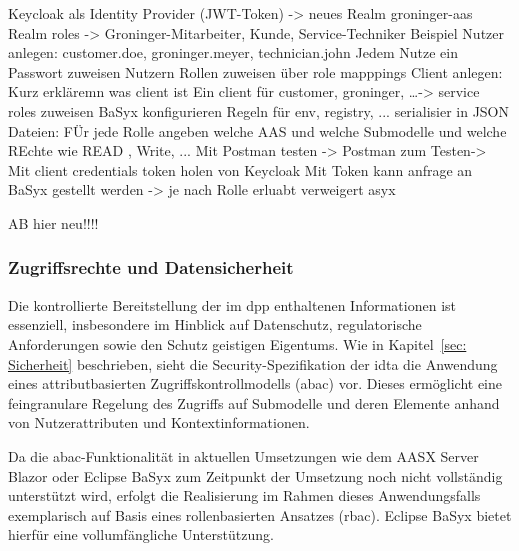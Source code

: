 Keycloak als Identity Provider (JWT-Token) -> neues Realm groninger-aas
Realm roles -> Groninger-Mitarbeiter, Kunde, Service-Techniker
Beispiel Nutzer anlegen: customer.doe, groninger.meyer, technician.john
Jedem Nutze ein Passwort zuweisen
Nutzern Rollen zuweisen über role mapppings
Client anlegen: Kurz erkläremn was client ist
Ein client für customer, groninger, \dots -> service roles zuweisen
BaSyx konfigurieren Regeln für env, registry, ... serialisier in JSON Dateien: 
FÜr jede Rolle angeben welche AAS und welche Submodelle und welche REchte wie READ , Write, ...
Mit Postman testen -> 
Postman zum Testen-> Mit client credentials token holen von Keycloak
Mit Token kann anfrage an BaSyx gestellt werden
 -> je nach Rolle erluabt verweigert asyx 



AB hier neu!!!!

\subsubsection{Zugriffsrechte und Datensicherheit}

Die kontrollierte Bereitstellung der im \acs{dpp} enthaltenen Informationen ist essenziell, insbesondere im Hinblick auf Datenschutz, regulatorische Anforderungen sowie den Schutz geistigen Eigentums. Wie in Kapitel~\ref{sec: Sicherheit} beschrieben, sieht die Security-Spezifikation der \acs{idta} die Anwendung eines attributbasierten Zugriffskontrollmodells (\acs{abac}) vor. Dieses ermöglicht eine feingranulare Regelung des Zugriffs auf Submodelle und deren Elemente anhand von Nutzerattributen und Kontextinformationen.

Da die \acs{abac}-Funktionalität in aktuellen Umsetzungen wie dem AASX Server Blazor oder Eclipse BaSyx zum Zeitpunkt der Umsetzung noch nicht vollständig unterstützt wird, erfolgt die Realisierung im Rahmen dieses Anwendungsfalls exemplarisch auf Basis eines rollenbasierten Ansatzes (\acs{rbac}). Eclipse BaSyx bietet hierfür eine vollumfängliche Unterstützung.

